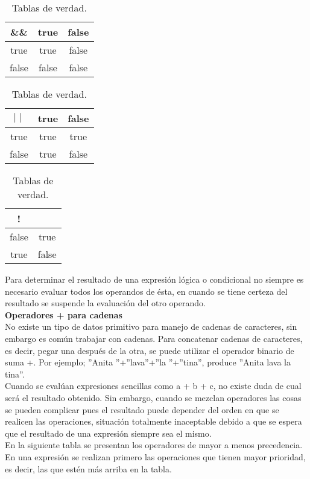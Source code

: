 \documentclass[12pt, A4]{article}
\begin{document}
{{{\begin{table}[h!]
	\centering
	\begin{tabular}{ c | c | c }
		 \&\& & true & false\\ \hline
		true& true & false\\
		false & false & false\\ \hline
	\end{tabular}
\hspace{1 cm}
	\begin{tabular}{ccc}
		 $\mid\mid$ & true & false\\ \hline
		true& true & true \\
		false & true & false\\ \hline
	\end{tabular}
\hspace{1 cm}
	\begin{tabular}{cc}
			\rowcolor{LightBlue2}! &  \\ \hline
			false & true\\
			true & false \\ \hline
	\end{tabular}
	\caption{Tablas de verdad.}
\end{table}
Para determinar el resultado de una expresión lógica o condicional no siempre es necesario evaluar todos los operandos de ésta, en cuando se tiene certeza del resultado se suspende la evaluación del otro operando.\\
\textbf{{{\Large } Operadores + para cadenas }}\\
No existe un tipo de datos primitivo para manejo de cadenas de caracteres, sin embargo es común trabajar con cadenas. Para concatenar cadenas de caracteres, es decir, pegar una después de la otra, se puede utilizar el operador binario de suma +. Por ejemplo; ''Anita ''+''lava''+''la ''+''tina'', produce 
''Anita lava la tina''.\\
Cuando se evalúan expresiones sencillas como a + b + c, no existe duda de cual será el resultado obtenido. Sin embargo, cuando se mezclan operadores las cosas se pueden complicar  pues el resultado puede depender del orden en que se realicen las operaciones, situación totalmente inaceptable debido a que se espera que el resultado de una expresión siempre sea el mismo.\\ En la siguiente tabla se presentan los operadores de mayor a menos precedencia. En una expresión se realizan primero las operaciones que tienen mayor prioridad, es decir, las que estén más arriba en la tabla.

}}}
\end{document}
